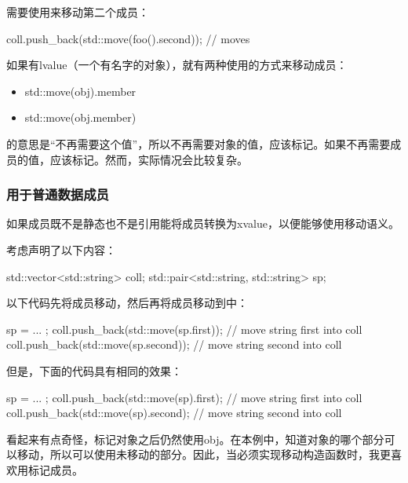需要使用来移动第二个成员：

\begin{cppcode}
coll.push_back(std::move(foo().second)); // moves
\end{cppcode}

如果有lvalue（一个有名字的对象），就有两种使用的方式来移动成员：

\begin{itemize}
	\item std::move(obj).member
	\item std::move(obj.member)
\end{itemize}

的意思是“不再需要这个值”，所以不再需要对象的值，应该标记。如果不再需要成员的值，应该标记。然而，实际情况会比较复杂。

\subsubsection{用于普通数据成员}

如果成员既不是静态也不是引用能将成员转换为xvalue，以便能够使用移动语义。

考虑声明了以下内容：

\begin{cppcode}
std::vector<std::string> coll;
std::pair<std::string, std::string> sp;
\end{cppcode}

以下代码先将成员移动，然后再将成员移动到中：

\begin{cppcode}
sp = ... ;
coll.push_back(std::move(sp.first)); // move string first into coll
coll.push_back(std::move(sp.second)); // move string second into coll
\end{cppcode}

但是，下面的代码具有相同的效果：

\begin{cppcode}
sp = ... ;
coll.push_back(std::move(sp).first); // move string first into coll
coll.push_back(std::move(sp).second); // move string second into coll
\end{cppcode}

看起来有点奇怪，标记对象之后仍然使用obj。在本例中，知道对象的哪个部分可以移动，所以可以使用未移动的部分。因此，当必须实现移动构造函数时，我更喜欢用标记成员。

